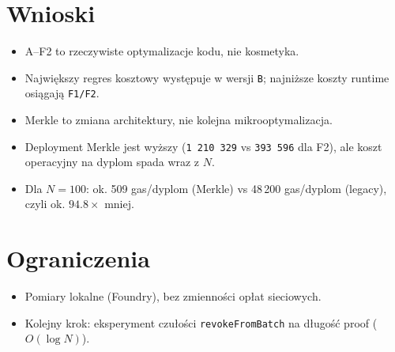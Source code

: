 \documentclass[11pt,a4paper]{article}
\begin{document}
\section{Wnioski}
\begin{itemize}
  \item A--F2 to rzeczywiste optymalizacje kodu, nie kosmetyka.
  \item Największy regres kosztowy występuje w wersji \texttt{B}; najniższe koszty runtime osiągają \texttt{F1/F2}.
  \item Merkle to zmiana architektury, nie kolejna mikrooptymalizacja.
  \item Deployment Merkle jest wyższy (\texttt{1\,210\,329} vs \texttt{393\,596} dla F2), ale koszt operacyjny na dyplom spada wraz z \(N\).
  \item Dla \(N=100\): ok. 509 gas/dyplom (Merkle) vs 48\,200 gas/dyplom (legacy), czyli ok. \(94.8\times\) mniej.
\end{itemize}

\section{Ograniczenia}
\begin{itemize}
  \item Pomiary lokalne (Foundry), bez zmienności opłat sieciowych.
  \item Kolejny krok: eksperyment czułości \texttt{revokeFromBatch} na długość proof (\(O(\log N)\)).
\end{itemize}
\end{document}
